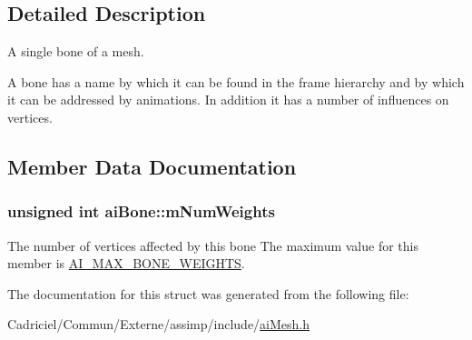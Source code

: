 \subsection{Detailed Description}
A single bone of a mesh. 

A bone has a name by which it can be found in the frame hierarchy and by which it can be addressed by animations. In addition it has a number of influences on vertices. 

\subsection{Member Data Documentation}
\hypertarget{structai_bone_a87a79d42a0132753aac66397ad6f9b71}{
\subsubsection[{m\-Num\-Weights}]{\setlength{\rightskip}{0pt plus 5cm}unsigned int ai\-Bone\-::m\-Num\-Weights}}\label{structai_bone_a87a79d42a0132753aac66397ad6f9b71}
The number of vertices affected by this bone The maximum value for this member is \hyperlink{ai_mesh_8h_a565e88bbf36ef4957f1229609e51b7f6}{A\-I\-\_\-\-M\-A\-X\-\_\-\-B\-O\-N\-E\-\_\-\-W\-E\-I\-G\-H\-T\-S}. 

The documentation for this struct was generated from the following file\-:\begin{DoxyCompactItemize}
\item 
Cadriciel/\-Commun/\-Externe/assimp/include/\hyperlink{ai_mesh_8h}{ai\-Mesh.\-h}\end{DoxyCompactItemize}

